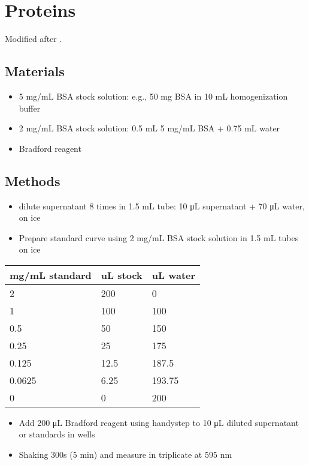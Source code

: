 \documentclass[
]{book}
\providecommand{\tightlist}{%
  \setlength{\itemsep}{0pt}\setlength{\parskip}{0pt}}
\begin{document}
\hypertarget{proteins}{%
\chapter{Proteins}\label{proteins}}

Modified after \textcite{bradford1976}.

\hypertarget{materials-2}{%
\section{Materials}\label{materials-2}}

\begin{itemize}
\tightlist
\item
  5 mg/mL BSA stock solution: e.g., 50 mg BSA in 10 mL homogenization buffer
\item
  2 mg/mL BSA stock solution: 0.5 mL 5 mg/mL BSA + 0.75 mL water
\item
  Bradford reagent
\end{itemize}

\hypertarget{methods-2}{%
\section{Methods}\label{methods-2}}

\begin{itemize}
\tightlist
\item
  dilute supernatant 8 times in 1.5 mL tube: 10 μL supernatant + 70 μL water, on ice
\item
  Prepare standard curve using 2 mg/mL BSA stock solution in 1.5 mL tubes on ice
\end{itemize}

\begin{longtable}[]{@{}lll@{}}
\toprule()
mg/mL standard & uL stock & uL water \\
\midrule()
\endhead
2 & 200 & 0 \\
1 & 100 & 100 \\
0.5 & 50 & 150 \\
0.25 & 25 & 175 \\
0.125 & 12.5 & 187.5 \\
0.0625 & 6.25 & 193.75 \\
0 & 0 & 200 \\
\bottomrule()
\end{longtable}

\begin{itemize}
\tightlist
\item
  Add 200 μL Bradford reagent using handystep to 10 μL diluted supernatant or standards in wells
\item
  Shaking 300s (5 min) and measure in triplicate at 595 nm
\end{itemize}
\end{document}
